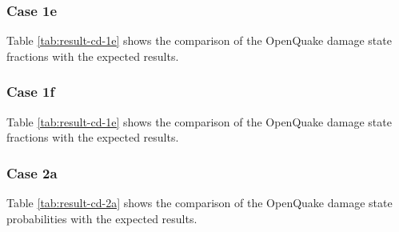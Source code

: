 \subsubsection{Case 1e}



Table \ref{tab:result-cd-1e} shows the comparison of the OpenQuake damage state fractions with the expected results.

\subsubsection{Case 1f}



Table \ref{tab:result-cd-1e} shows the comparison of the OpenQuake damage state fractions with the expected results.

\subsubsection{Case 2a}



Table \ref{tab:result-cd-2a} shows the comparison of the OpenQuake damage state probabilities with the expected results.
